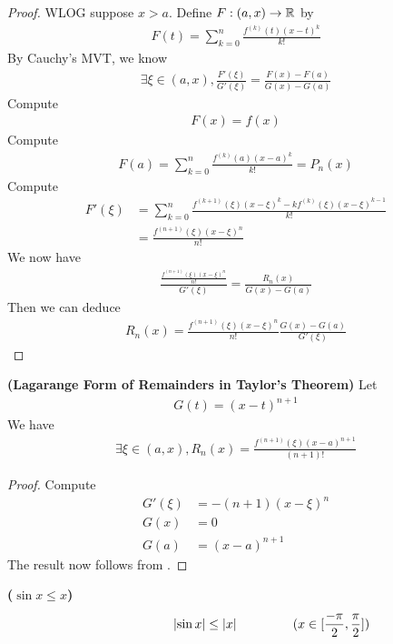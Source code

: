 \documentclass{report}
\begin{document}
\begin{proof}
WLOG suppose $x>a$. Define $F:(a,x)\to \mathbb{R}$ by 
\begin{align*}
F(t)=\sum_{k=0}^n \frac{f^{(k)}(t)(x-t)^k}{k!}
\end{align*}
By Cauchy's MVT, we know  
\begin{align*}
\exists \xi\in (a,x),\frac{F'(\xi)}{G'(\xi)}=\frac{F(x)-F(a)}{G(x)-G(a)}
\end{align*}
Compute 
\begin{align*}
F(x)=f(x)
\end{align*}
Compute 
\begin{align*}
F(a)=\sum_{k=0}^n \frac{f^{(k)}(a)(x-a)^k}{k!}=P_n(x)
\end{align*}
Compute 
\begin{align*}
F'(\xi)&=\sum_{k=0}^n \frac{f^{(k+1)}(\xi)(x-\xi)^k-k f^{(k)}(\xi)(x-\xi)^{k-1}}{k!}\\
&=\frac{f^{(n+1)}(\xi)(x-\xi)^n}{n!} 
\end{align*}
We now have 
\begin{align*}
\frac{\frac{f^{(n+1)}(\xi)(x-\xi)^{n}}{n!}}{G'(\xi)}=\frac{R_n(x)}{G(x)-G(a)}
\end{align*}
Then we can deduce 
\begin{align*}
R_n(x)=\frac{f^{(n+1)}(\xi)(x-\xi)^n}{n!}\frac{G(x)-G(a)}{G'(\xi)}
\end{align*}
\end{proof}
\begin{corollary}
\label{6.5.3}
\textbf{(Lagarange Form of Remainders in Taylor's Theorem)} Let 
\begin{align*}
G(t)=(x-t)^{n+1}
\end{align*}
We have
\begin{align*}
\exists \xi \in (a,x), R_n(x)=\frac{f^{(n+1)}(\xi)(x-a)^{n+1}}{(n+1)!} 
\end{align*}
\end{corollary}
\begin{proof}
Compute 
\begin{align*}
G'(\xi)&=-(n+1)(x-\xi)^{n}\\
G(x)&=0\\
G(a)&=(x-a)^{n+1}
\end{align*}
The result now follows from . 
\end{proof}
\begin{theorem}
\label{sinxx}
\textbf{($\sin x\leq x$)}
\begin{align*}
\hspace{2cm}\left|\sin x\right|\leq \left|x\right|\hspace{1.5cm}(x\in [\frac{-\pi}{2},\frac{\pi}{2}])
\end{align*}
\end{theorem}
\end{document}
